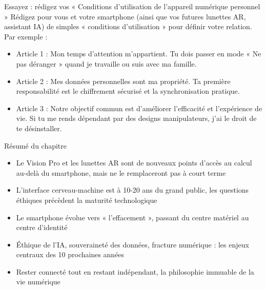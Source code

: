 \begin{tcbpractice}{Essayez : rédigez vos « Conditions d'utilisation de l'appareil numérique personnel »}
Rédigez pour vous et votre smartphone (ainsi que vos futures lunettes AR, assistant IA) de simples « conditions d'utilisation » pour définir votre relation. Par exemple :

\begin{itemize}
  \item Article 1 : Mon temps d'attention m'appartient. Tu dois passer en mode « Ne pas déranger » quand je travaille ou suis avec ma famille.
  \item Article 2 : Mes données personnelles sont ma propriété. Ta première responsabilité est le chiffrement sécurisé et la synchronisation pratique.
  \item Article 3 : Notre objectif commun est d'améliorer l'efficacité et l'expérience de vie. Si tu me rends dépendant par des designs manipulateurs, j'ai le droit de te désinstaller.
\end{itemize}

\end{tcbpractice}

\begin{tcbsummary}{Résumé du chapitre}
\begin{itemize}
  \item Le Vision Pro et les lunettes AR sont de nouveaux points d'accès au calcul au-delà du smartphone, mais ne le remplaceront pas à court terme
  \item L'interface cerveau-machine est à 10-20 ans du grand public, les questions éthiques précèdent la maturité technologique
  \item Le smartphone évolue vers « l'effacement », passant du centre matériel au centre d'identité
  \item Éthique de l'IA, souveraineté des données, fracture numérique : les enjeux centraux des 10 prochaines années
  \item Rester connecté tout en restant indépendant, la philosophie immuable de la vie numérique
\end{itemize}

\end{tcbsummary}
